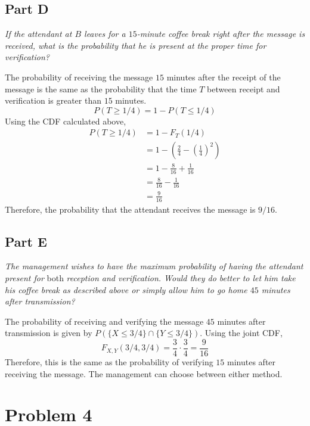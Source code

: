 \documentclass{article}
\begin{document}
\subsection*{Part D}

\textit{If the attendant at $B$ leaves for a $15$-minute coffee break right
after the message is received, what is the probability that he is present at
the proper time for verification?}

\bigbreak

The probability of receiving the message $15$ minutes after the receipt of
the message is the same as the probability that the time $T$ between receipt
and verification is greater than $15$ minutes.
$$ P(T \geq 1/4) = 1 - P(T \leq 1/4) $$
Using the CDF calculated above,
\begin{align*}
    P(T \geq 1/4) &= 1 - F_T(1/4) \\
    &= 1 - \left(\frac{2}{4} - \left(\frac{1}{4}\right)^2\right) \\
    &= 1 - \frac{8}{16} + \frac{1}{16} \\
    &= \frac{8}{16} - \frac{1}{16} \\
    &= \frac{9}{16}
\end{align*}
Therefore, the probability that the attendant receives the message is $ 9/16 $.

\subsection*{Part E}

\textit{The management wishes to have the maximum probability of having the
attendant present for} both \textit{reception and verification. Would they do
better to let him take his coffee break as described above or simply allow
him to go home $45$ minutes after transmission?}

\bigbreak

The probability of receiving and verifying the message $45$ minutes after
transmission is given by $P(\{X \leq 3/4\} \cap \{Y \leq 3/4\})$. Using the
joint CDF,
$$ F_{X,Y}(3/4, 3/4) = \frac{3}{4} \cdot \frac{3}{4} = \frac{9}{16} $$
Therefore, this is the same as the probability of verifying $15$ minutes
after receiving the message. The management can choose between either method.

\section*{Problem 4}
\end{document}
